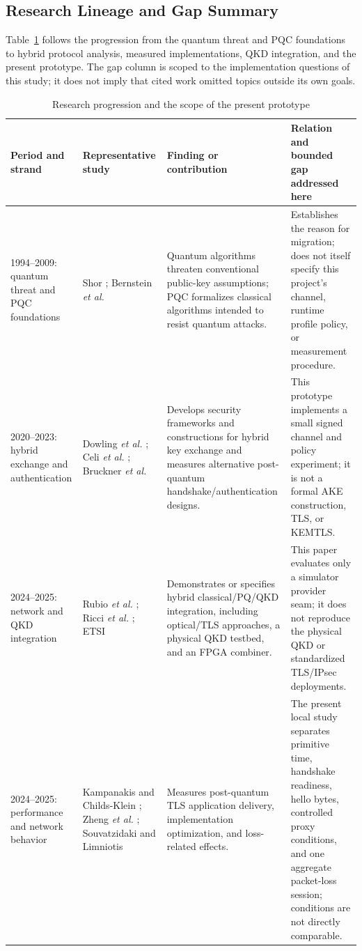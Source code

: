 \documentclass[journal]{IEEEtran}
\begin{document}
\subsection{Research Lineage and Gap Summary}
Table~\ref{tab:literature} follows the progression from the quantum threat and PQC foundations to hybrid protocol analysis, measured implementations, QKD integration, and the present prototype. The gap column is scoped to the implementation questions of this study; it does not imply that cited work omitted topics outside its own goals.

\begin{table}[t]
\caption{Research progression and the scope of the present prototype}
\label{tab:literature}
\centering
\footnotesize
\begin{tabular}{p{}p{}p{}p{}}
\toprule
Period and strand & Representative study & Finding or contribution & Relation and bounded gap addressed here \\
\midrule
1994--2009: quantum threat and PQC foundations & Shor \cite{shor1994}; Bernstein \emph{et al.} \cite{bernstein2009} & Quantum algorithms threaten conventional public-key assumptions; PQC formalizes classical algorithms intended to resist quantum attacks. & Establishes the reason for migration; does not itself specify this project's channel, runtime profile policy, or measurement procedure. \\
2020--2023: hybrid exchange and authentication & Dowling \emph{et al.} \cite{dowling2020}; Celi \emph{et al.} \cite{celi2021}; Bruckner \emph{et al.} \cite{bruckner2023} & Develops security frameworks and constructions for hybrid key exchange and measures alternative post-quantum handshake/authentication designs. & This prototype implements a small signed channel and policy experiment; it is not a formal AKE construction, TLS, or KEMTLS. \\
2024--2025: network and QKD integration & Rubio \emph{et al.} \cite{rubio2024tls,rubio2024ofc,rubio2025}; Ricci \emph{et al.} \cite{ricci2024}; ETSI \cite{etsi103744} & Demonstrates or specifies hybrid classical/PQ/QKD integration, including optical/TLS approaches, a physical QKD testbed, and an FPGA combiner. & This paper evaluates only a simulator provider seam; it does not reproduce the physical QKD or standardized TLS/IPsec deployments. \\
2024--2025: performance and network behavior & Kampanakis and Childs-Klein \cite{kampanakis2024}; Zheng \emph{et al.} \cite{zheng2024}; Souvatzidaki and Limniotis \cite{souvatzidaki2025} & Measures post-quantum TLS application delivery, implementation optimization, and loss-related effects. & The present local study separates primitive time, handshake readiness, hello bytes, controlled proxy conditions, and one aggregate packet-loss session; conditions are not directly comparable. \\

\end{tabular}
\end{table}
\end{document}
